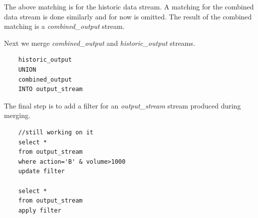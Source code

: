 \documentclass{article}
\begin{document}
The above matching is for the historic data stream. A matching for the combined data stream is done similarly and for now is omitted. The result of the combined matching is a \emph{combined\_output} stream. 

Next we merge \emph{combined\_output} and \emph{historic\_output} streams. 

\begin{verbatim}
    historic_output
    UNION
    combined_output
    INTO output_stream
\end{verbatim}

The final step is to add a filter for an \emph{output\_stream} stream produced during merging. 

\begin{verbatim}
    //still working on it
    select *
    from output_stream
    where action='B' & volume>1000
    update filter
    
    select *
    from output_stream
    apply filter
\end{verbatim}
\end{document}
